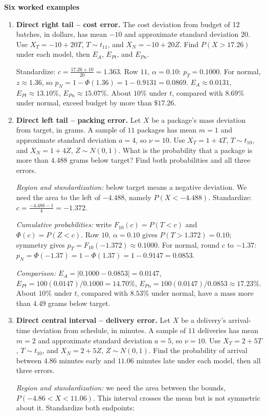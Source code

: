 	\textbf{Six worked examples}
	\begin{enumerate}[leftmargin=*,label=\textbf{\arabic*.},itemsep=5pt]
		\item \textbf{Direct right tail -- cost error.} The cost deviation from budget of 12 batches, in dollars, has mean $-10$ and approximate standard deviation $20$. Use $X_T=-10+20T$, $T\sim t_{11}$, and $X_N=-10+20Z$. Find $P(X>17.26)$ under each model, then $E_A$, $E_{Pt}$, and $E_{Pn}$.
		\par Standardize: $c=\frac{17.26+10}{20}=1.363$. Row $11$, $\alpha=0.10$: $p_T=0.1000$. For normal, $z\approx1.36$, so $p_N=1-\Phi(1.36)=1-0.9131=0.0869$.
		$E_A\approx0.0131$, $E_{Pt}\approx13.10\%$, $E_{Pn}\approx15.07\%$. About $10\%$ under $t$, compared with $8.69\%$ under normal, exceed budget by more than $\$17.26$.
		\item \textbf{Direct left tail -- packing error.} Let $X$ be a package's mass deviation from target, in grams. A sample of $11$ packages has mean $m=1$ and approximate standard deviation $a=4$, so $\nu=10$. Use $X_T=1+4T$, $T\sim t_{10}$, and $X_N=1+4Z$, $Z\sim N(0,1)$. What is the probability that a package is more than $4.488$ grams below target? Find both probabilities and all three errors.
		\par \textit{Region and standardization:} below target means a negative deviation. We need the area to the left of $-4.488$, namely $P(X<-4.488)$. Standardize: $c=\frac{-4.488-1}{4}=-1.372$.
		\par \textit{Cumulative probabilities:} write $F_{10}(c)=P(T<c)$ and $\Phi(c)=P(Z<c)$. Row $10$, $\alpha=0.10$ gives $P(T>1.372)=0.10$; symmetry gives $p_T=F_{10}(-1.372)\approx0.1000$. For normal, round $c$ to $-1.37$: $p_N=\Phi(-1.37)=1-\Phi(1.37)=1-0.9147=0.0853$.
		\par \textit{Comparison:} $E_A=|0.1000-0.0853|=0.0147$, $E_{Pt}=100(0.0147)/0.1000=14.70\%$, $E_{Pn}=100(0.0147)/0.0853\approx17.23\%$. About $10\%$ under $t$, compared with $8.53\%$ under normal, have a mass more than $4.49$ grams below target.
		\item \textbf{Direct central interval -- delivery error.} Let $X$ be a delivery's arrival-time deviation from schedule, in minutes. A sample of $11$ deliveries has mean $m=2$ and approximate standard deviation $a=5$, so $\nu=10$. Use $X_T=2+5T$, $T\sim t_{10}$, and $X_N=2+5Z$, $Z\sim N(0,1)$. Find the probability of arrival between $4.86$ minutes early and $11.06$ minutes late under each model, then all three errors.
		\par \textit{Region and standardization:} we need the area between the bounds, $P(-4.86<X<11.06)$. This interval crosses the mean but is not symmetric about it. Standardize both endpoints:

\end{enumerate}
